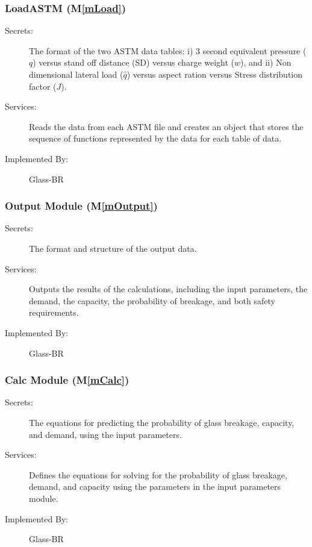 \documentclass[12pt]{article}
\newcommand{\mref}[1]{M\ref{#1}}
\begin{document}
\subsubsection{LoadASTM (\mref{mLoad})}

\begin{description}
\item[Secrets:] The format of the two ASTM data tables: i) 3 second equivalent
  pressure ($q$) versus stand off distance (SD) versus charge weight ($w$), and
  ii) Non dimensional lateral load ($\hat q$) versus aspect ration versus Stress
  distribution factor ($J$).
\item[Services:] Reads the data from each ASTM file and creates an object that
  stores the sequence of functions represented by the data for each table of
  data.
\item[Implemented By:] Glass-BR
\end{description}

\subsubsection{Output Module (\mref{mOutput})}

\begin{description}
\item[Secrets:] The format and structure of the output data.
\item[Services:] Outputs the results of the calculations, including the input
  parameters, the demand, the capacity, the probability of breakage, and both 
  safety requirements.
\item[Implemented By:] Glass-BR
\end{description} 

\subsubsection{Calc Module (\mref{mCalc})}

\begin{description}
\item[Secrets:] The equations for predicting the probability of glass 
breakage, capacity, and demand, using the input parameters.
\item[Services:] Defines the equations for solving for the probability of glass 
breakage, demand, and capacity using the parameters in the input parameters 
module.
\item[Implemented By:] Glass-BR
\end{description} 
 
\end{document}
